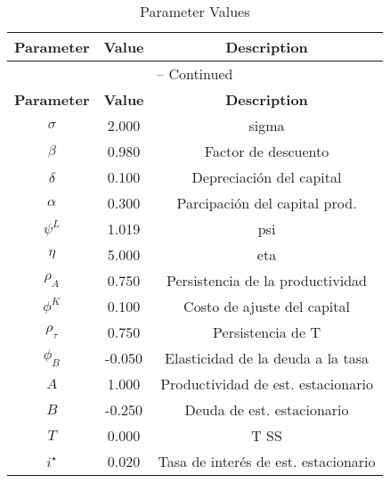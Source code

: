 \begin{center}
\begin{longtable}{ccc}
\caption{Parameter Values}\\%
\toprule%
\multicolumn{1}{c}{\textbf{Parameter}} &
\multicolumn{1}{c}{\textbf{Value}} &
 \multicolumn{1}{c}{\textbf{Description}}\\%
\midrule%
\endfirsthead
\multicolumn{3}{c}{{\tablename} \thetable{} -- Continued}\\%
\midrule%
\multicolumn{1}{c}{\textbf{Parameter}} &
\multicolumn{1}{c}{\textbf{Value}} &
  \multicolumn{1}{c}{\textbf{Description}}\\%
\midrule%
\endhead
$\sigma$ 	 & 	 2.000 	 & 	 sigma\\
$\beta$ 	 & 	 0.980 	 & 	 Factor de descuento\\
$\delta$ 	 & 	 0.100 	 & 	 Depreciación del capital\\
$\alpha$ 	 & 	 0.300 	 & 	 Parcipación del capital prod.\\
$\psi^L$ 	 & 	 1.019 	 & 	 psi\\
$\eta$ 	 & 	 5.000 	 & 	 eta\\
$\rho_{A}$ 	 & 	 0.750 	 & 	 Persistencia de la productividad\\
$\phi^{K}$ 	 & 	 0.100 	 & 	 Costo de ajuste del capital\\
$\rho_{\tau}$ 	 & 	 0.750 	 & 	 Persistencia de T\\
$\phi_{B}$ 	 & 	 -0.050 	 & 	 Elasticidad de la deuda a la tasa\\
$A$ 	 & 	 1.000 	 & 	 Productividad de est. estacionario\\
$B$ 	 & 	 -0.250 	 & 	 Deuda de est. estacionario\\
$T$ 	 & 	 0.000 	 & 	 T SS\\
$i^{\star}$ 	 & 	 0.020 	 & 	 Tasa de interés de est. estacionario\\
\bottomrule%
\end{longtable}
\end{center}
